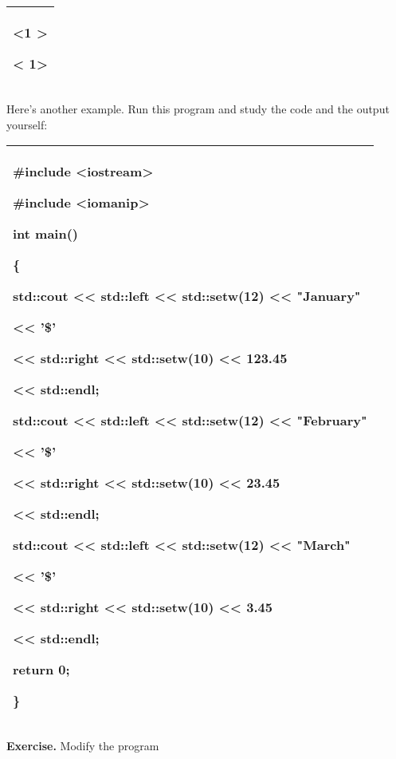 \documentclass[
]{article}
\begin{document}
\begin{longtable}[]{@{}l@{}}
\toprule
\endhead
\begin{minipage}[t]{0.97\columnwidth}\raggedright
\textless1 \textgreater{}

\textless{} 1\textgreater{}\strut
\end{minipage}\tabularnewline
\bottomrule
\end{longtable}

Here's another example. Run this program and study the code and the
output yourself:

\begin{longtable}[]{@{}l@{}}
\toprule
\endhead
\begin{minipage}[t]{0.97\columnwidth}\raggedright
\#include \textless iostream\textgreater{}

\#include \textless iomanip\textgreater{}

int main()

\{

std::cout \textless\textless{} std::left \textless\textless{}
std::setw(12) \textless\textless{} "January"

\textless\textless{} '\$'

\textless\textless{} std::right \textless\textless{} std::setw(10)
\textless\textless{} 123.45

\textless\textless{} std::endl;

std::cout \textless\textless{} std::left \textless\textless{}
std::setw(12) \textless\textless{} "February"

\textless\textless{} '\$'

\textless\textless{} std::right \textless\textless{} std::setw(10)
\textless\textless{} 23.45

\textless\textless{} std::endl;

std::cout \textless\textless{} std::left \textless\textless{}
std::setw(12) \textless\textless{} "March"

\textless\textless{} '\$'

\textless\textless{} std::right \textless\textless{} std::setw(10)
\textless\textless{} 3.45

\textless\textless{} std::endl;

return 0;

\}\strut
\end{minipage}\tabularnewline
\bottomrule
\end{longtable}

\textbf{Exercise. }Modify the program\textbf{ }
\end{document}
